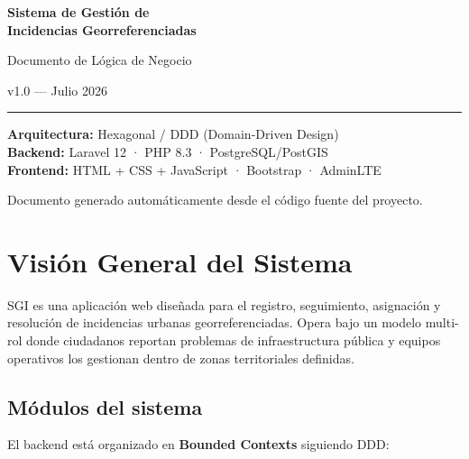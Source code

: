 \documentclass[11pt, a4paper]{article}
\begin{document}
\begin{titlepage}
  \centering
  \vspace*{3cm}

  {\Huge\bfseries\textcolor{primary}{Sistema de Gestión de\\[0.3em]Incidencias Georreferenciadas}}

  \vspace{0.8cm}
  {\Large\textcolor{accent}{Documento de Lógica de Negocio}}

  \vspace{0.5cm}
  {\large\textcolor{muted}{v1.0 — Julio 2026}}

  \vspace{2cm}

  \textcolor{primary}{\rule{0.6\textwidth}{1.5pt}}

  \vspace{1.5cm}

  {\large
    \textbf{Arquitectura:} Hexagonal / DDD (Domain-Driven Design)\\[0.4em]
    \textbf{Backend:} Laravel 12 · PHP 8.3 · PostgreSQL/PostGIS\\[0.4em]
    \textbf{Frontend:} HTML + CSS + JavaScript · Bootstrap · AdminLTE
  }

  \vfill
  {\small\textcolor{muted}{Documento generado automáticamente desde el código fuente del proyecto.}}
\end{titlepage}

\tableofcontents
\newpage

\section{Visión General del Sistema}

SGI es una aplicación web diseñada para el registro, seguimiento, asignación y resolución de incidencias urbanas georreferenciadas. Opera bajo un modelo multi-rol donde ciudadanos reportan problemas de infraestructura pública y equipos operativos los gestionan dentro de zonas territoriales definidas.

\subsection{Módulos del sistema}

El backend está organizado en \textbf{Bounded Contexts} siguiendo DDD:
\end{document}
